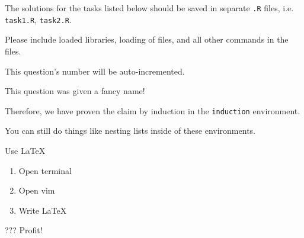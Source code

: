 \documentclass[11pt,largemargins, letter]{homework}
\begin{document}
\maketitle

The solutions for the tasks listed below should be saved in separate \texttt{.R} files, i.e. \texttt{task1.R}, \texttt{task2.R}.

Please include loaded libraries, loading of files, and all other commands in the files.

\question
  This question's number will be auto-incremented.


\question
  This question was given a fancy name!

  Therefore, we have proven the claim by induction in the \texttt{induction} environment.

\question
  You can still do things like nesting lists inside of these environments.
  \begin{alphaparts}
    \questionpart Use \LaTeX
      \begin{enumerate}
        \item Open terminal
        \item Open vim
        \item Write LaTeX
      \end{enumerate}
    \questionpart ???
    \questionpart Profit!
  \end{alphaparts}
\end{document}
